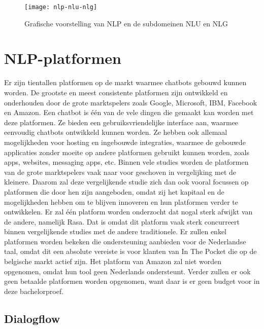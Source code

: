 \begin{figure}[!htbp]
    \label{fig:nlp-nlu-nlg}
    \centering
    \texttt{[image: nlp-nlu-nlg]}
    \caption{Grafische voorstelling van NLP en de subdomeinen NLU en NLG}
\end{figure}

\section{NLP-platformen}
\label{sec:nlp-platformen}

Er zijn tientallen platformen op de markt waarmee chatbots gebouwd kunnen worden. De grootste en meest consistente platformen zijn ontwikkeld en onderhouden door de grote marktspelers zoals Google, Microsoft, IBM, Facebook en Amazon. Een chatbot is één van de vele dingen die gemaakt kan worden met deze platformen. Ze bieden een gebruiksvriendelijke interface aan, waarmee eenvoudig chatbots ontwikkeld kunnen worden. Ze hebben ook allemaal mogelijkheden voor hosting en ingebouwde integraties, waarmee de gebouwde applicaties zonder moeite op andere platformen gebruikt kunnen worden, zoals apps, websites, messaging apps, etc. Binnen vele studies worden de platformen van de grote marktspelers vaak naar voor geschoven in vergelijking met de kleinere. Daarom zal deze vergelijkende studie zich dan ook vooral focussen op platformen die door hen zijn aangeboden, omdat zij het kapitaal en de mogelijkheden hebben om te blijven innoveren en hun platformen verder te ontwikkelen. Er zal één platform worden onderzocht dat nogal sterk afwijkt van de andere, namelijk Rasa. Dat is omdat dit platform vaak sterk concurreert binnen vergelijkende studies met de andere traditionele. Er zullen enkel platformen worden bekeken die ondersteuning aanbieden voor de Nederlandse taal, omdat dit een absolute vereiste is voor klanten van In The Pocket die op de belgische markt actief zijn. Het platform van Amazon zal niet worden opgenomen, omdat hun tool geen Nederlands ondersteunt. Verder zullen er ook geen betaalde platformen worden opgenomen, want daar is er geen budget voor in deze bachelorproef.

\subsection{Dialogflow}
\label{subsec:nlp-platformen-dialogflow}

